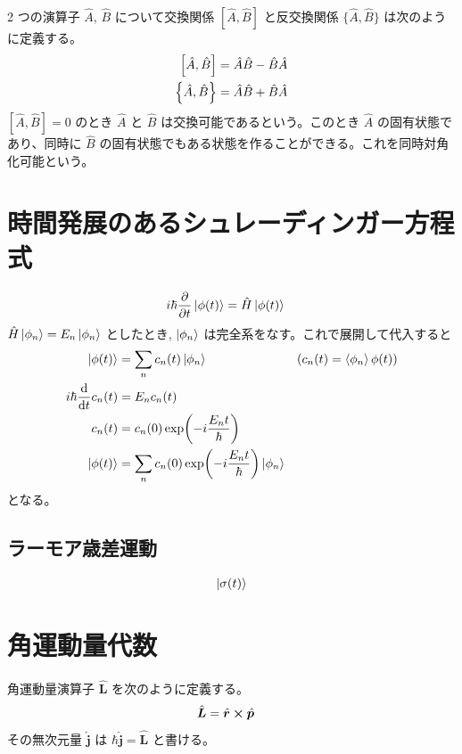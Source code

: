 \documentclass[uplatex,dvipdfmx,a4paper,11pt]{jlreq}
\newcommand{\rr}{\bm{r}}
\newcommand{\pp}{\bm{p}}
\theoremstyle{definition}
\begin{document}
\begin{definition}
  2 つの演算子 $\hat{A}$, $\hat{B}$ について交換関係 $[\hat{A}, \hat{B}]$ と反交換関係 $\lbrace\hat{A}, \hat{B}\rbrace$ は次のように定義する。
  \begin{align}
    \qty[\hat{A}, \hat{B}] & = \hat{A}\hat{B} - \hat{B}\hat{A} \\
    \qty{\hat{A}, \hat{B}} & = \hat{A}\hat{B} + \hat{B}\hat{A}
  \end{align}
  $[\hat{A}, \hat{B}] = 0$ のとき $\hat{A}$ と $\hat{B}$ は交換可能であるという。このとき $\hat{A}$ の固有状態であり、同時に $\hat{B}$ の固有状態でもある状態を作ることができる。これを同時対角化可能という。
\end{definition}

\section{時間発展のあるシュレーディンガー方程式}
\begin{align}
  i\hbar\pdv{t}\ket{\phi(t)} & = \hat{H}\ket{\phi(t)}
\end{align}
$\hat{H}\ket{\phi_n} = E_n\ket{\phi_n}$ としたとき, $\ket{\phi_n}$ は完全系をなす。これで展開して代入すると
\begin{align}
  \ket{\phi(t)}      & = \sum_nc_n(t)\ket{\phi_n}                           & \qty(c_n(t) = \braket{\phi_n}{\phi(t)}) \\
  i\hbar\dv{t}c_n(t) & = E_nc_n(t)                                                                                    \\
  c_n(t)             & = c_n(0)\exp(-i\frac{E_nt}{\hbar})                                                             \\
  \ket{\phi(t)}      & = \sum_nc_n(0)\exp(-i\frac{E_nt}{\hbar})\ket{\phi_n}
\end{align}
となる。


\subsection{ラーモア歳差運動}
\begin{align}
  \ket{\sigma(t)}
\end{align}



\section{角運動量代数}
\begin{definition}
  角運動量演算子 $\hat{\bm{L}}$ を次のように定義する。
  \begin{align}
    \hat{\bm{L}} & = \hat{\rr}\cross\hat{\pp}
  \end{align}
  その無次元量 $\hat{\bm{j}}$ は $\hbar\hat{\bm{j}} = \hat{\bm{L}}$ と書ける。
\end{definition}
\end{document}
